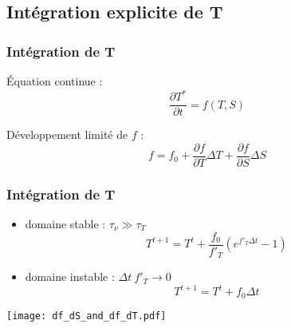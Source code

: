 \subsection*{Intégration explicite de T}

\begin{frame}
\frametitle{Intégration de T}

\'Equation continue :
$$ \frac{\partial T^*}{\partial t} = f(T,S)$$

Développement limité de $f$ :
$$ f = f_0 + \frac{\partial f}{\partial T} \Delta T + \frac{\partial f}{\partial S} \Delta S$$

\end{frame}

\begin{frame}
\frametitle{Intégration de T}
\begin{itemize}

\item domaine stable : $\tau_{\nu} \gg \tau_T$ 
$$T^{t+1} = T^t + \frac{f_0}{f'_T} \left( e^{f'_T \Delta t} - 1 \right) $$

\item domaine instable : $\Delta t\ f'_T \rightarrow 0$
$$T^{t+1} = T^t + f_0 \Delta t$$

\end{itemize}
\end{frame}

\begin{frame}
    \begin{center}
    \texttt{[image: df\_dS\_and\_df\_dT.pdf]}
    \end{center}
\end{frame}
